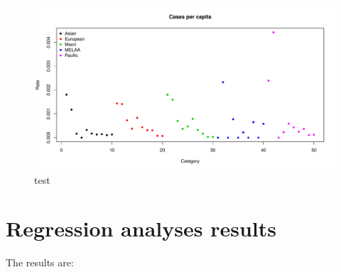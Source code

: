 \documentclass{article}
\begin{document}
\begin{figure}[h!]
\begin{center}
\includegraphics{interimreport2-029}
\end{center}
\caption{test}
\label{fig:test}
\end{figure}

\section{Regression analyses results}
\label{sub:regression_results}
The results are:
\end{document}
